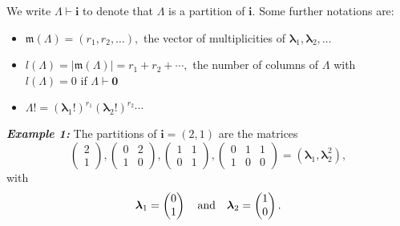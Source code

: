 \noindent We write \(\Lambda \vdash \boldsymbol{i}\) to denote that
\(\Lambda\) is a partition of \(\boldsymbol{i}.\) Some further notations
are:

\begin{itemize}
\item
  \(\mathfrak{m}(\Lambda)=(r_1, r_2, \ldots),\) the vector of
  multiplicities of
  \(\boldsymbol{\lambda}_1, \boldsymbol{\lambda}_2, \ldots\)
\item
  \(l(\Lambda)=|\mathfrak{m}(\Lambda)|=r_1 + r_2 + \cdots,\) the number
  of columns of \(\Lambda\) with \(l(\Lambda )=0\) if
  \(\Lambda \vdash \boldsymbol{0}\)
\item
  \(\Lambda! = (\boldsymbol{\lambda}_1!)^{r_1} (\boldsymbol{\lambda}_2!)^{r_2} \cdots\)
\end{itemize}

\hskip-0.5cm \textbf{\emph{Example 1:}} The partitions of
\(\boldsymbol{i}=(2,1)\) are the matrices \[
\begin{pmatrix}
2 \\
1
\end{pmatrix}, \begin{pmatrix}
0 & 2 \\
1 & 0
\end{pmatrix}, \begin{pmatrix}
1 & 1 \\
0 & 1
\end{pmatrix}, \begin{pmatrix}
0 & 1 & 1 \\
1 & 0 & 0
\end{pmatrix} = (\boldsymbol{\lambda}_1, \boldsymbol{\lambda}_2^2),\]
with \[
\boldsymbol{\lambda}_1 = \begin{pmatrix}
0 \\
1
\end{pmatrix} \quad \hbox{and} \quad \boldsymbol{\lambda}_2 = \begin{pmatrix}
1 \\
0
\end{pmatrix}.
\]

